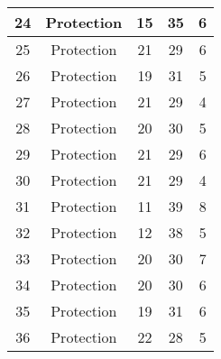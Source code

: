 \documentclass[results.tex]{subfiles}
\begin{document}
\begin{center}
\begin{tabular}{| c || c | c | c | c |}
            \hline
            24                      & Protection                   & 15                     & 35                      & 6                    \\
            \hline
            25                      & Protection                   & 21                     & 29                      & 6                    \\
            \hline
            26                      & Protection                   & 19                     & 31                      & 5                    \\
            \hline
            27                      & Protection                   & 21                     & 29                      & 4                    \\
            \hline
            28                      & Protection                   & 20                     & 30                      & 5                    \\
            \hline
            29                      & Protection                   & 21                     & 29                      & 6                    \\
            \hline
            30                      & Protection                   & 21                     & 29                      & 4                    \\
            \hline
            31                      & Protection                   & 11                     & 39                      & 8                    \\
            \hline
            32                      & Protection                   & 12                     & 38                      & 5                    \\
            \hline
            33                      & Protection                   & 20                     & 30                      & 7                    \\
            \hline
            34                      & Protection                   & 20                     & 30                      & 6                    \\
            \hline
            35                      & Protection                   & 19                     & 31                      & 6                    \\
            \hline
            36                      & Protection                   & 22                     & 28                      & 5                    \\

\end{tabular}
\end{center}
\end{document}
